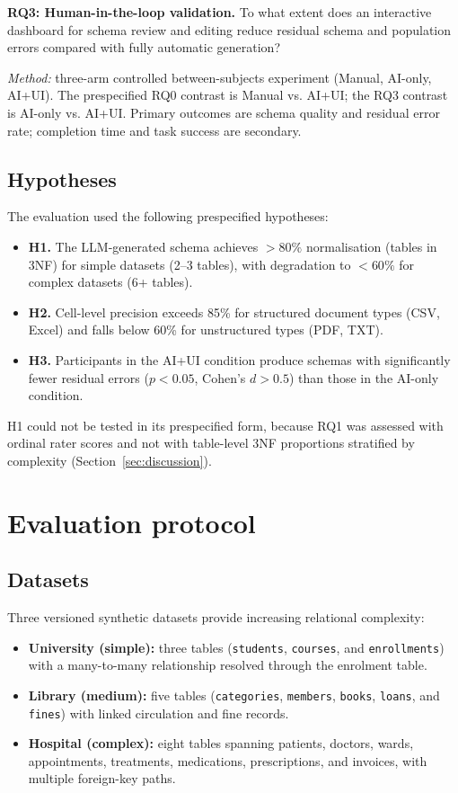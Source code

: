 \documentclass[11pt,a4paper]{article}
\begin{document}
\bigskip
\noindent\textbf{RQ3: Human-in-the-loop validation.} To what extent does an interactive dashboard for schema review and editing reduce residual schema and population errors compared with fully automatic generation?

\noindent\textit{Method:} three-arm controlled between-subjects experiment (Manual, AI-only, AI+UI). The prespecified RQ0 contrast is Manual vs. AI+UI; the RQ3 contrast is AI-only vs. AI+UI. Primary outcomes are schema quality and residual error rate; completion time and task success are secondary.

\subsection{Hypotheses}
The evaluation used the following prespecified hypotheses:

\begin{itemize}
  \item \textbf{H1.} The LLM-generated schema achieves $>80\%$ normalisation (tables in 3NF) for simple datasets (2--3 tables), with degradation to $<60\%$ for complex datasets (6+ tables).
  \item \textbf{H2.} Cell-level precision exceeds 85\% for structured document types (CSV, Excel) and falls below 60\% for unstructured types (PDF, TXT).
  \item \textbf{H3.} Participants in the AI+UI condition produce schemas with significantly fewer residual errors ($p < 0.05$, Cohen's $d > 0.5$) than those in the AI-only condition.
\end{itemize}
H1 could not be tested in its prespecified form, because RQ1 was assessed with ordinal rater scores and not with table-level 3NF proportions stratified by complexity (Section~\ref{sec:discussion}).

\section{Evaluation protocol}
\label{sec:eval}

\subsection{Datasets}
Three versioned synthetic datasets provide increasing relational complexity:

\begin{itemize}
  \item \textbf{University (simple):} three tables (\texttt{students},
  \texttt{courses}, and \texttt{enrollments}) with a many-to-many relationship
  resolved through the enrolment table.
  \item \textbf{Library (medium):} five tables (\texttt{categories},
  \texttt{members}, \texttt{books}, \texttt{loans}, and \texttt{fines}) with
  linked circulation and fine records.
  \item \textbf{Hospital (complex):} eight tables spanning patients, doctors,
  wards, appointments, treatments, medications, prescriptions, and invoices,
  with multiple foreign-key paths.
\end{itemize}
\end{document}
